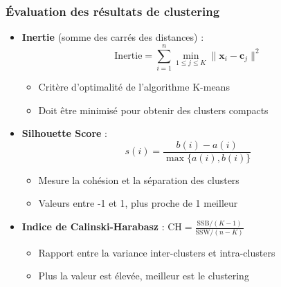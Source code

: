 \documentclass{beamer}
\begin{document}
\begin{frame}[fragile]
	\frametitle{Évaluation des résultats de clustering}
	\begin{itemize}
		\item \textbf{Inertie} (somme des carrés des distances) :
		\begin{equation*}
			\text{Inertie} = \sum_{i=1}^n \min_{1 \leq j \leq K} \|\mathbf{x}_i - \mathbf{c}_j\|^2
		\end{equation*}
		\begin{itemize}
			\item Critère d'optimalité de l'algorithme K-means
			\item Doit être minimisé pour obtenir des clusters compacts
		\end{itemize}
		\item \textbf{Silhouette Score} :
		\begin{equation*}
			s(i) = \frac{b(i) - a(i)}{\max\{a(i), b(i)\}}
		\end{equation*}
		\begin{itemize}
			\item Mesure la cohésion et la séparation des clusters
			\item Valeurs entre -1 et 1, plus proche de 1 meilleur
		\end{itemize}
		\item \textbf{Indice de Calinski-Harabasz} :
		$
			\text{CH} = \frac{\text{SSB} / (K - 1)}{\text{SSW} / (n - K)}
		$
		\begin{itemize}
			\item Rapport entre la variance inter-clusters et intra-clusters
			\item Plus la valeur est élevée, meilleur est le clustering
		\end{itemize}
	\end{itemize}
\end{frame}
\end{document}
